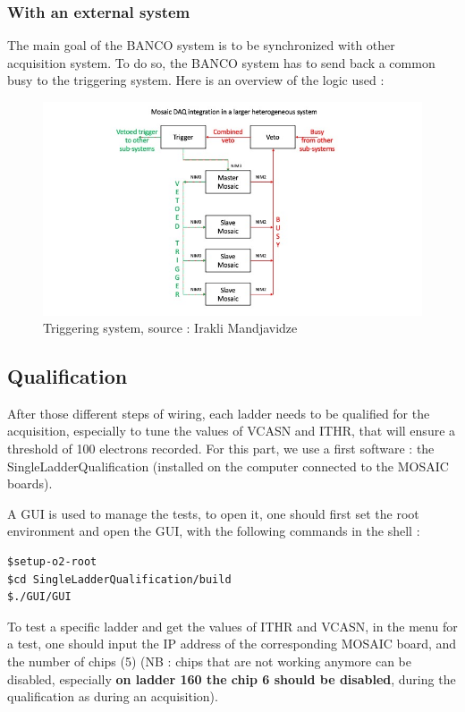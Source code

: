 \documentclass[12pt,oneside,a4]{article}
\begin{document}
        \subsubsection{With an external system}
The main goal of the BANCO system is to be synchronized with other acquisition system. To do so, the BANCO system has to send back a common busy to the triggering system. Here is an overview of the logic used :
\begin{figure}[h]
\hspace*{-2cm}
        \centering
        \includegraphics[scale =0.8]{figures/Triggering.jpeg}
        \caption{Triggering system, source : Irakli Mandjavidze}
        \label{fig:8}
\end{figure}

    \subsection{Qualification}\label{Qualification}
After those different steps of wiring,  each ladder needs to be qualified for the acquisition, especially to tune the values of VCASN and ITHR, that will ensure a threshold of 100 electrons recorded. For this part, we use a first software : the SingleLadderQualification \cite{SingleLadderQualification} (installed on the computer connected to the MOSAIC boards).

A GUI is used to manage the tests, to open it, one should first set the root environment and open the GUI, with the following commands in the shell :

\begin{verbatim}
$setup-o2-root
$cd SingleLadderQualification/build
$./GUI/GUI
\end{verbatim}

To test a specific ladder and get the values of ITHR and VCASN, in the menu for a test, one should input the IP address of the corresponding MOSAIC board, and the number of chips (5) (NB : chips that are not working anymore can be disabled, especially \textbf{on ladder 160 the chip 6 should be disabled}, during the qualification as during an acquisition).
\end{document}
